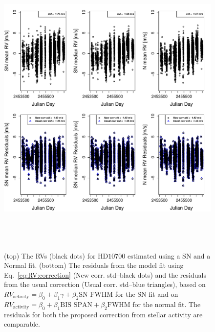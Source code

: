 \documentclass{aa}
\begin{document}
\begin{figure} 
\begin{center}
\includegraphics[height = 6in]{NEW_CORRECTIONHD10700_[3]CorrectionActivity_RadialVelocity_vs_time.pdf} 
   \caption{(top) The RVs (black dots) for $\text{HD}10700$ estimated using a SN and a Normal fit.
 (bottom) The residuals from the model fit using Eq.~\eqref{eq:RV:correction} (New corr. std--black dots) and the residuals from the usual correction (Usual corr. std--blue triangles), based on $RV_{\text{activity}}=\beta_0+\beta_1 \gamma + \beta_2 \text{SN FWHM}$ for the SN fit and on $RV_{\text{activity}}=\beta_0+\beta_1 \text{BIS SPAN} + \beta_2 \text{FWHM}$ for the normal fit. The residuals for both the proposed correction from stellar activity are comparable.}
   \label{fig:HD10700:correctionRV}
\end{center}
\end{figure}
\end{document}

